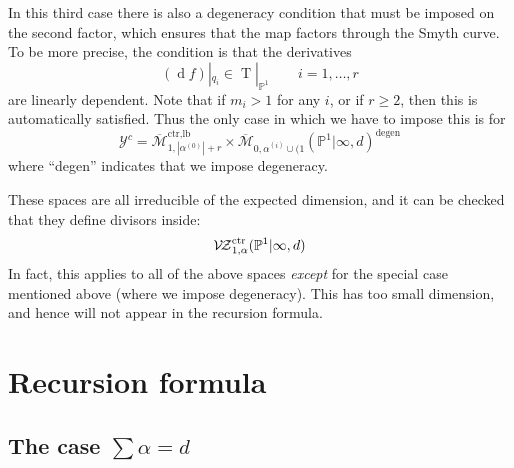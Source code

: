 \documentclass[11pt]{amsart}
\newcommand{\oM}{\overline{\mathcal{M}}}
\newcommand{\M}[4]{\overline{\mathcal{M}}_{#1,#2}(#3,#4)}
\newcommand{\PP}{\mathbb P}
\newcommand{\VZc}[4]{\mathcal{V\!Z}^{\rm{ctr}}_{#1,#2}(#3,#4)}
\theoremstyle{definition}
\theoremstyle{definition}
\begin{document}
In this third case there is also a degeneracy condition that must be imposed on the second factor, which ensures that the map factors through the Smyth curve. To be more precise, the condition is that the derivatives
\begin{equation*} (\operatorname{d}\!f)|_{q_i} \in \operatorname{T}|_{\PP^1} \qquad i=1,\ldots,r \end{equation*}
are linearly dependent. Note that if $m_i > 1$ for any $i$, or if $r \geq 2$, then this is automatically satisfied. Thus the only case in which we have to impose this is for
\begin{equation*} \mathcal{Y}^c = \oM^{\operatorname{ctr,lb}}_{1,|\alpha^{(0)}|+r} \times {\M{0}{\alpha^{(i)}\cup (1}{\PP^1|\infty}{d}}^{\operatorname{degen}} \end{equation*}
where ``degen'' indicates that we impose degeneracy.

These spaces are all irreducible of the expected dimension, and it can be checked that they define divisors inside:
\begin{equation*} \VZc{1}{\alpha}{\PP^1|\infty}{d} \end{equation*}
In fact, this applies to all of the above spaces \emph{except} for the special case mentioned above (where we impose degeneracy). This has too small dimension, and hence will not appear in the recursion formula.



\section{Recursion formula}

\subsection{The case $\sum\alpha=d$}
\end{document}
